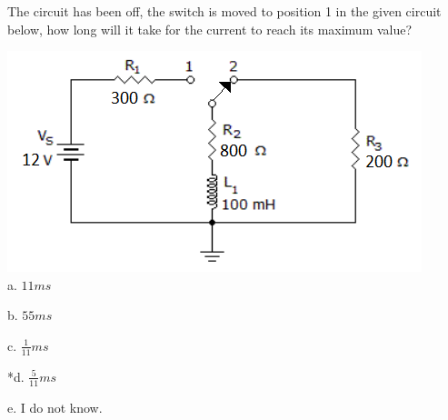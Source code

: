 
The circuit has been off, the switch is moved to position 1 in the given circuit below, how long will it take for the current to reach its maximum value?

\includegraphics[width=4.75in,height=2.53125in]{../../Images/BasicElectronicComponentsQ13.png}\\

a. \( 11 ms \)

b. \( 55 ms \)

c. \( \frac{1}{11} ms \)

*d. \( \frac{5}{11} ms \)

e. I do not know.\\

